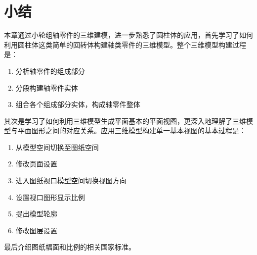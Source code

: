 \section{小结}
本章通过小轮组轴零件的三维建模，进一步熟悉了圆柱体的应用，首先学习了如何利用圆柱体这类简单的回转体构建轴类零件的三维模型。整个三维模型构建过程是：
\begin{enumerate}
\item 分析轴零件的组成部分
\item 分段构建轴零件实体
\item 组合各个组成部分实体，构成轴零件整体
\end{enumerate} 

其次是学习了如何利用三维模型生成平面基本的平面视图，更深入地理解了三维模型与平面图形之间的对应关系。应用三维模型构建单一基本视图的基本过程是：
\begin{enumerate}
\item 从模型空间切换至图纸空间
\item 修改页面设置
\item 进入图纸视口模型空间切换视图方向
\item 设置视口图形显示比例
\item 提出模型轮廓
\item 修改图层设置
\end{enumerate}
最后介绍图纸幅面和比例的相关国家标准。
\endinput